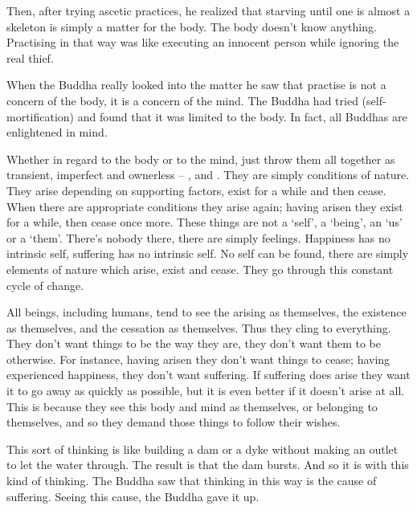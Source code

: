 Then, after trying ascetic practices, he realized that starving until one is almost a skeleton is simply a matter for the body. The body doesn't know anything. Practising in that way was like executing an innocent person while ignoring the real thief. 

When the Buddha really looked into the matter he saw that practise is not a concern of the body, it is a concern of the mind. The Buddha had tried  (self-mortification) and found that it was limited to the body. In fact, all Buddhas are enlightened in mind. 

Whether in regard to the body or to the mind, just throw them all together as transient, imperfect and ownerless --  ,   and . They are simply conditions of nature. They arise depending on supporting factors, exist for a while and then cease. When there are appropriate conditions they arise again; having arisen they exist for a while, then cease once more. These things are not a `self', a `being', an `us' or a `them'. There's nobody there, there are simply feelings. Happiness has no intrinsic self, suffering has no intrinsic self. No self can be found, there are simply elements of nature which arise, exist and cease. They go through this constant cycle of change. 

All beings, including humans, tend to see the arising as themselves, the existence as themselves, and the cessation as themselves. Thus they cling to everything. They don't want things to be the way they are, they don't want them to be otherwise. For instance, having arisen they don't want things to cease; having experienced happiness, they don't want suffering. If suffering does arise they want it to go away as quickly as possible, but it is even better if it doesn't arise at all. This is because they see this body and mind as themselves, or belonging to themselves, and so they demand those things to follow their wishes. 

This sort of thinking is like building a dam or a dyke without making an outlet to let the water through. The result is that the dam bursts. And so it is with this kind of thinking. The Buddha saw that thinking in this way is the cause of suffering. Seeing this cause, the Buddha gave it up. 

